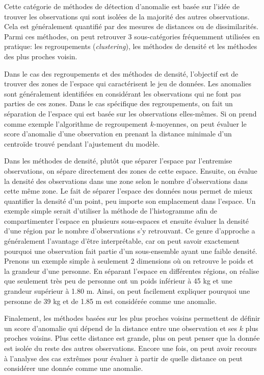 Cette catégorie de méthodes de détection d'anomalie est basée sur l'idée de trouver les observations qui sont isolées de la majorité des autres observations. Cela est généralement quantifié par des mesures de distances ou de dissimilarités. Parmi ces méthodes, on peut retrouver 3 sous-catégories fréquemment utilisées en pratique: les regroupements (\textit{clustering}), les méthodes de densité et les méthodes des plus proches voisin.

Dans le cas des regroupements et des méthodes de densité, l'objectif est de trouver des zones de l'espace qui caractérisent le jeu de données. Les anomalies sont généralement identifiées en considérant les observations qui ne font pas parties de ces zones. Dans le cas spécifique des regroupements, on fait un séparation de l'espace qui est basée sur les observations elles-mêmes. Si on prend comme exemple l'algorithme de regroupement $k$-moyennes, on peut évaluer le score d'anomalie d'une observation en prenant la distance minimale d'un centroïde trouvé pendant l'ajustement du modèle.

Dans les méthodes de densité, plutôt que séparer l'espace par l'entremise observations, on sépare directement des zones de cette espace. Ensuite, on évalue la densité des observations dans une zone selon le nombre d'observations dans cette même zone. Le fait de séparer l'espace des données nous permet de mieux quantifier la densité d'un point, peu importe son emplacement dans l'espace. Un exemple simple serait d'utiliser la méthode de l'histogramme afin de compartimenter l'espace en plusieurs sous-espaces et ensuite évaluer la densité d'une région par le nombre d'observations s'y retrouvant. Ce genre d'approche a généralement l'avantage d'être interprétable, car on peut savoir exactement pourquoi une observation fait partie d'un sous-ensemble ayant une faible densité. Prenons un exemple simple à seulement 2 dimensions où on retrouve le poids et la grandeur d'une personne. En séparant l'espace en différentes régions, on réalise que seulement très peu de personne ont un poids inférieur à 45 kg et une grandeur supérieur à 1.80 m. Ainsi, on peut facilement expliquer pourquoi une personne de 39 kg et de 1.85 m est considérée comme une anomalie. 
 
 Finalement, les méthodes basées sur les plus proches voisins permettent de définir un score d'anomalie qui dépend de la distance entre une observation et ses $k$ plus proches voisins. Plus cette distance est grande, plus on peut penser que la donnée est isolée du reste des autres observations. Encore une fois, on peut avoir recours à l'analyse des cas extrêmes pour évaluer à partir de quelle distance on peut considérer une donnée comme une anomalie.


